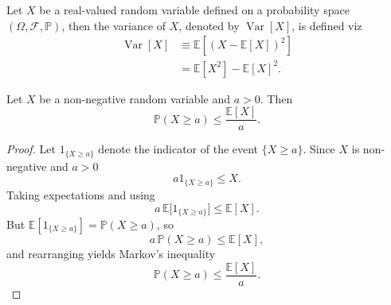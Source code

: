 \begin{definition}[Variance]
	\label{def:variance}
	Let $X$ be a real-valued random variable defined on a probability space $(\Omega, \mathcal{F},\mathbb{P})$, then the variance of $X$, denoted by $\operatorname{Var}[X]$, is defined viz
	\begin{equation}
		\begin{split}
			\operatorname{Var}[X]&\equiv \mathbb{E}[(X-\mathbb{E}[X])^2]\\
			&= \mathbb{E}[X^2]-\mathbb{E}[X]^2.
		\end{split}
	\end{equation}
\end{definition}

\begin{theorem}
Let $X$ be a non-negative random variable and $a > 0$. Then
\begin{equation}
\mathbb{P}(X \geq a) \leq \frac{\mathbb{E}[X]}{a}.
\end{equation}
\end{theorem}
\begin{proof}
	Let $1_{\{X\ge a\}}$ denote the indicator of the event $\{X\ge a\}$. Since $X$ is non-negative and $a>0$
	\begin{equation}
		a1_{\{X\ge a\}} \le X.
	\end{equation}
	Taking expectations and using 
	\begin{equation}
		a\,\mathbb{E}\big[1_{\{X\ge a\}}\big] \le \mathbb{E}[X].
	\end{equation}
	But $\mathbb{E}[1_{\{X\ge a\}}]=\mathbb{P}(X\ge a)$, so
	\begin{equation}
		a\,\mathbb{P}(X\ge a) \le \mathbb{E}[X],
	\end{equation}
	and rearranging yields Markov's inequality
	\begin{equation}
		\mathbb{P}(X\ge a) \le \frac{\mathbb{E}[X]}{a}.
	\end{equation}
\end{proof}

